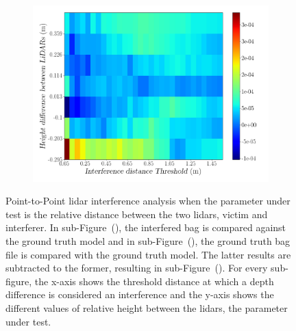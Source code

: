 \begin{figure}[!ht]
\begin{subfigure}[c]{0.45\textwidth}
	\label{fig:height:ground-truth-color-mesh}
\end{subfigure}
\\ \vspace{4mm}
\begin{subfigure}[c]{0.6\textwidth}
	\includegraphics[width=\textwidth]{img/lidar-interference/height/difference_ground_truth_interference_measurement.png}
\caption{}%
	\label{fig:height:difference-color-mesh}
\end{subfigure}

\caption[Point-to-Point analysis when the relative height  between \acsp{lidar} optical center is variated.]{Point-to-Point \ac{lidar} interference analysis when the parameter under test is the relative distance between the two \acp{lidar}, victim and interferer. In sub-Figure~(), the interfered bag is compared against the ground truth model and in sub-Figure~(), the ground truth bag file is compared with the ground truth model. The latter results are subtracted to the former, resulting in sub-Figure~(). For every sub-figure, the x-axis shows the threshold distance at which a depth difference is considered an interference and the y-axis shows the different values of relative height between the \acp{lidar}, the parameter under test.}
\label{fig:height:color-mesh}
\end{figure}


